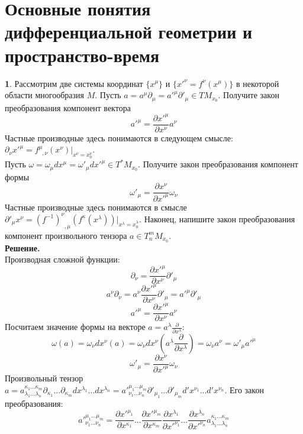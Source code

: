 \documentclass[12pt]{article}
\theoremstyle{definition}
\newtheorem{zad}{}[section]
\begin{document}
\section{Основные понятия дифференциальной геометрии и пространство-время}
\begin{zad}
Рассмотрим две системы координат $\{x^\mu\}$ и $\{x'^\nu=f^\nu(x^\mu)\}$ в некоторой области многообразия $M$. Пусть $a=a^\mu\partial_\mu=a'^\mu\partial'_\mu\in TM_{x_0}$. Получите закон преобразования компонент вектора \begin{equation}
    a'^\mu=\frac{\partial x'^\mu}{\partial x^\nu}a^\nu
\end{equation}
Частные производные здесь понимаются в следующем смысле: $\partial_\nu x'^\mu=f^\mu_{\;\;,\nu}(x^\nu)|_{x^\nu=x_0^\nu}$.\\
Пусть $\omega=\omega_\mu dx^\mu=\omega'_\mu dx'^\mu\in T^*M_{x_0}$. Получите закон преобразования компонент формы
\begin{equation}
    \omega'_\mu=\frac{\partial x^\nu}{\partial x'^\mu}\omega_\nu
\end{equation}
Частные производные здесь понимаются в смысле $\partial'_\mu x^\nu=(f^{-1})^\nu_{\;\;,\mu}(f^\kappa(x^\lambda))|_{x^\lambda=x_0^\lambda}$. Наконец, напишите закон преобразования компонент произвольного тензора $a\in T_n^mM_{x_0}$.\\
\textbf{Решение.}\\
Производная сложной функции:
\begin{equation}
    \partial_\nu=\frac{\partial x'^\mu}{\partial x^\nu}\partial'_\mu
\end{equation}
\begin{equation}
    a^\nu\partial_\nu=a^\nu\frac{\partial x'^\mu}{\partial x^\nu}\partial'_\mu=a'^\mu\partial'_\mu
\end{equation}
\begin{equation}
    \boxed{a'^\mu=\frac{\partial x'^\mu}{\partial x^\nu}a^\nu}
\end{equation}
Посчитаем значение формы на векторе $a=a^\lambda\frac{\partial}{\partial x^\lambda}$:
\begin{equation}
    \omega(a)=\omega_\nu dx^\nu(a)=\omega_\nu dx^\nu\left(a^\lambda\frac{\partial}{\partial x^\lambda}\right)=\omega_\nu a^\nu=\omega'_\mu a'^\mu
\end{equation}
\begin{equation}
    \boxed{\omega'_\mu=\frac{\partial x^\nu}{\partial x'^\mu}\omega_\nu}
\end{equation}
Произвольный тензор $a=a_{\lambda_1...\lambda_n}^{\kappa_1...\kappa_m}\partial_{\kappa_1}...\partial_{\kappa_m}dx^{\lambda_1}...dx^{\lambda_n}=a'^{\mu_1...\mu_m}_{\nu_1...\nu_n}\partial'_{\mu_1}...\partial'_{\mu_m}d'x^{\nu_1}...d'x^{\nu_n}$. Его закон преобразования:
\begin{equation}
    \boxed{a'^{\mu_1...\mu_m}_{\nu_1...\nu_n}=\frac{\partial x'^{\mu_1}}{\partial x^{\kappa_1}}...\frac{\partial x'^{\mu_m}}{\partial x^{\kappa_m}}\frac{\partial x^{\lambda_1}}{\partial x'^{\nu_1}}...\frac{\partial x^{\lambda_n}}{\partial x'^{\nu_n}}a_{\lambda_1...\lambda_n}^{\kappa_1...\kappa_m}}
\end{equation}
\end{zad}
\end{document}

